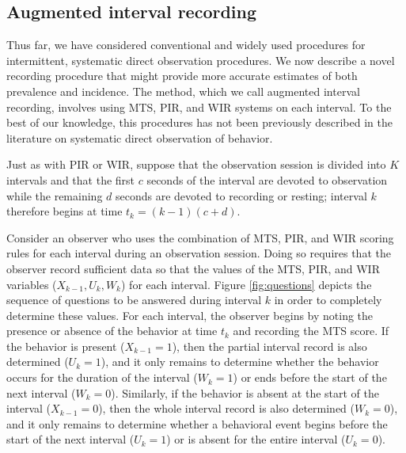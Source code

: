 \documentclass[man, noextraspace, floatsintext]{apa6}\usepackage[]{graphicx}\usepackage[]{color}
\begin{document}
\subsection{Augmented interval recording}
\label{subsec:AIR}

Thus far, we have considered conventional and widely used procedures for intermittent, systematic direct observation procedures. 
We now describe a novel recording procedure that might provide more accurate estimates of both prevalence and incidence. 
The method, which we call augmented interval recording, involves using MTS, PIR, and WIR systems on each interval. 
To the best of our knowledge, this procedures has not been previously described in the literature on systematic direct observation of behavior. 

Just as with PIR or WIR, suppose that the observation session is divided into $K$ intervals and that the first $c$ seconds of the interval are devoted to observation while the remaining $d$ seconds are devoted to recording or resting; interval $k$ therefore begins at time $t_k = (k - 1)(c + d)$. 

Consider an observer who uses the combination of MTS, PIR, and WIR scoring rules for each interval during an observation session. 
Doing so requires that the observer record sufficient data so that the values of the MTS, PIR, and WIR variables ($X_{k-1},U_k,W_k$) for each interval. 
Figure \ref{fig:questions} depicts the sequence of questions to be answered during interval $k$ in order to completely determine these values. 
For each interval, the observer begins by noting the presence or absence of the behavior at time $t_k$ and recording the MTS score. 
If the behavior is present ($X_{k-1} = 1$), then the partial interval record is also determined ($U_k = 1$), and it only remains to determine whether the behavior occurs for the duration of the interval ($W_k = 1$) or ends before the start of the next interval ($W_k = 0$). 
Similarly, if the behavior is absent at the start of the interval ($X_{k-1} = 0$), then the whole interval record is also determined ($W_k = 0$), and it only remains to determine whether a behavioral event begins before the start of the next interval ($U_k = 1$) or is absent for the entire interval ($U_k = 0$). 
\end{document}
